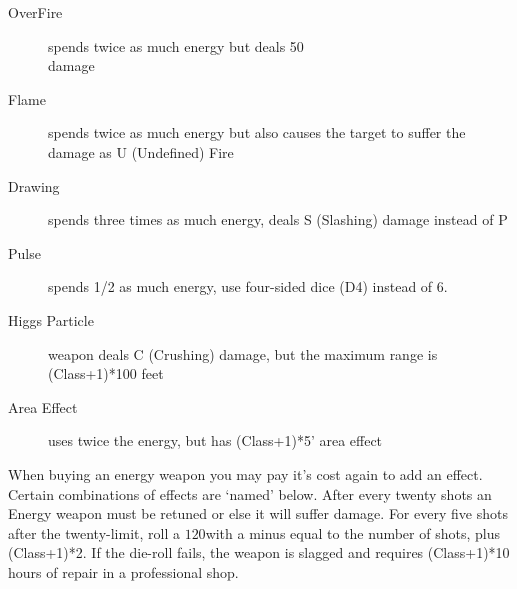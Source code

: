 \documentclass[twoside]{book}
\begin{document}
\begin{description}
    
  \item[ OverFire ]   spends twice as much energy but deals 50\\%
                 damage 
  \item[ Flame ]   spends twice as much energy but also causes the
                 target to suffer the damage as U (Undefined) Fire
                 
  \item[ Drawing ]   spends three times as much energy, deals S
                 (Slashing) damage instead of P 
  \item[ Pulse ]   spends 1/2 as much energy, use four-sided dice
                 (D4) instead of 6. 
  \item[ Higgs Particle ]   weapon deals C (Crushing) damage, but the maximum
                 range is (Class+1)*100 feet 
  \item[ Area Effect ]   uses twice the energy, but has (Class+1)*5'
                 area effect 
\end{description}
    When buying an energy weapon you may pay it's
               cost again to add an effect. Certain combinations of
               effects are `named' below.   After every twenty shots an Energy weapon must be
               retuned or else it will suffer damage. For every five
               shots after the twenty-limit, roll a \ensuremath{1}\ensuremath{20}\textscbf{}with a minus
               equal to the number of shots, plus (Class+1)*2. If the
               die-roll fails, the weapon is slagged and requires
               (Class+1)*10 hours of repair in a professional shop.
               
    
\end{document}
